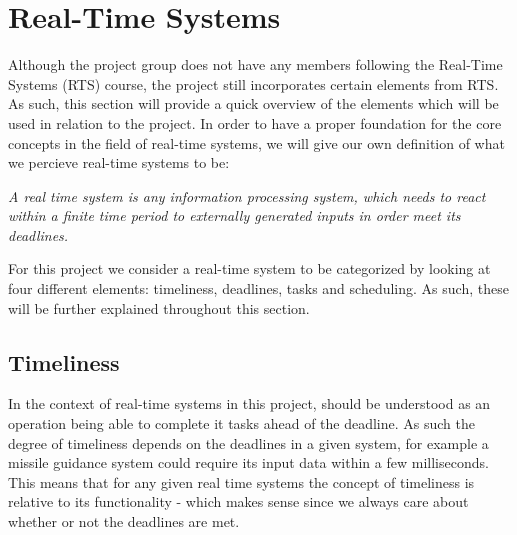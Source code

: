 \section{Real-Time Systems}
Although the project group does not have any members
following the Real-Time Systems (RTS) course, the project still incorporates certain elements from RTS.
As such, this section will provide a quick overview of the elements which will
be used in relation to the project.
In order to have a proper foundation for the core concepts in the field of
real-time systems, we will give our own definition of what we percieve real-time
systems to be:

\begin{center}
\begin{minipage}{0.8\linewidth}
\textit{A real time system is any information processing system, which needs to
react within a finite time period to externally generated inputs in order meet
its deadlines.}
\end{minipage}
\end{center}

For this project we consider a real-time system to be categorized by looking at
four different elements: timeliness, deadlines, tasks and scheduling. As such,
these will be further explained throughout this section.

\subsection{Timeliness}

In the context of real-time systems in this project,  should be understood as an operation being able to complete
it tasks ahead of the deadline. As such the degree of timeliness depends on the deadlines in a given system, for example a
missile guidance system could require its input data within a few milliseconds.
This means that for any given real time systems the concept of timeliness is
relative to its functionality - which makes sense since we always care about
whether or not the deadlines are met.


